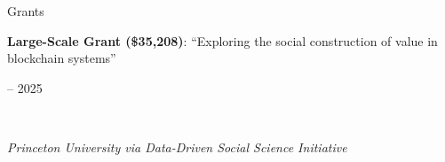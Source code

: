 \documentclass{cv} %
\begin{document}
\begin{cvSection}{Grants}
  \begin{minipage}[t]{0.80\linewidth}
    \raggedright \textbf{Large-Scale Grant (\$35,208)}: ``Exploring the social construction of value in blockchain systems''%
  \end{minipage}
  \hfill
  \begin{minipage}[t]{0.15\linewidth}
     -- 2025%
  \end{minipage}
  \\
  \begin{minipage}[t]{0.80\linewidth}
    \raggedright \textit{Princeton University via Data-Driven Social Science Initiative}%
  \end{minipage}
  \hfill
  \begin{minipage}[t]{0.15\linewidth}
  \end{minipage}

\end{cvSection}

\end{document}
